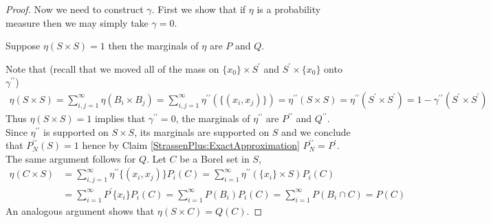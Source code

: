 \begin{proof}
Now we need to construct $\gamma$.   First we show that if $\eta$ is a probability measure then we may simply take $\gamma = 0$.
\begin{clm}Suppose $\eta(S \times S) = 1$ then the marginals of $\eta$ are $P$ and $Q$.
\end{clm}
Note that (recall that we moved all of the mass on $\lbrace x_0 \rbrace \times S^\prime$ and $S^\prime \times \lbrace x_0 \rbrace$ onto $\gamma^{\prime \prime}$)
\begin{align*}
\eta(S \times S) = \sum_{i,j=1}^\infty \eta(B_i \times B_j) = \sum_{i,j=1}^\infty \eta^{\prime \prime}(\lbrace (x_i,x_j) \rbrace) = \eta^{\prime \prime}(S \times S) = \eta^{\prime \prime}(S^\prime \times S^\prime) = 1 - \gamma^{\prime \prime}(S^\prime \times S^\prime)
\end{align*}
Thus $\eta(S \times S)=1$ implies that $\gamma^{\prime \prime} = 0$, the marginals of $\eta^{\prime \prime}$ are $P^{\prime \prime}$ and $Q^{\prime \prime}$.  Since $\eta^{\prime \prime}$ is supported on $S \times S$, its marginals are supported on $S$ and we conclude that $P^{\prime \prime}_N(S) = 1$ hence by Claim \ref{StrassenPlus:ExactApproximation} $P^{\prime \prime}_N = P^{\prime}$.  The same argument follows for $Q$.  Let $C$ be a Borel set in $S$,
\begin{align*}
\eta(C \times S) &= \sum_{i,j = 1}^\infty \eta^{\prime \prime} \lbrace (x_i, x_j) \rbrace P_i (C) =  \sum_{i = 1}^\infty \eta^{\prime \prime} (\lbrace x_i \rbrace \times S ) P_i (C) \\
&=  \sum_{i = 1}^\infty P^\prime  \lbrace x_i \rbrace P_i (C)  = \sum_{i = 1}^\infty P(B_i) P_i (C) = \sum_{i = 1}^\infty P(B_i \cap C)  = P(C)
\end{align*}
An analogous argument shows that $\eta(S \times C) = Q(C)$.  


\end{proof}
